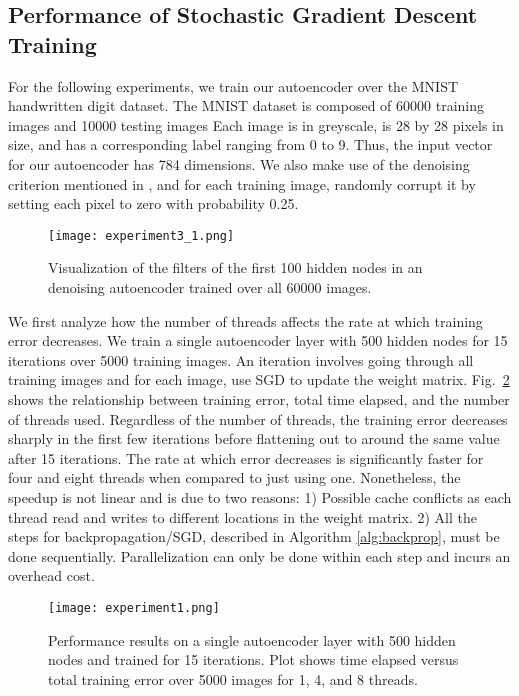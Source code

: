 \FloatBarrier
\subsection{Performance of Stochastic Gradient Descent Training}

For the following experiments, we train our autoencoder over the MNIST handwritten digit
dataset. The MNIST dataset is composed of 60000 training images and 10000
testing images Each image is in greyscale, is 28 by 28 pixels in size, and has
a corresponding label ranging from 0 to 9. Thus, the input vector for our
autoencoder has 784 dimensions. We also make use of the denoising criterion
mentioned in \cite{vincent2010stacked}, and for each training image, randomly
corrupt it by setting each pixel to zero with probability 0.25. 

\begin{figure}[h] \centering
	\texttt{[image: experiment3\_1.png]}
	\caption{Visualization of the filters of the first 100 hidden nodes in an
	denoising autoencoder trained over all 60000 images.}
	\label{fig:experiment3_1}
\end{figure}

We first analyze how the number of threads affects the rate at which training
error decreases. We train a single autoencoder layer with 500 hidden nodes for
15 iterations over 5000 training images. An iteration involves going through
all training images and for each image, use SGD to update the weight matrix.
Fig.~\ref{fig:experiment1} shows the relationship between training error, total
time elapsed, and the number of threads used. Regardless of the number of
threads, the training error decreases sharply in the first few iterations
before flattening out to around the same value after 15 iterations. The rate at
which error decreases is significantly faster for four and eight threads when
compared to just using one. Nonetheless, the speedup is not linear and is due
to two reasons: 1) Possible cache conflicts as each thread read and writes to
different locations in the weight matrix. 2) All the steps for
backpropagation/SGD, described in Algorithm \ref{alg:backprop}, must be done
sequentially. Parallelization can only be done within each step and incurs an
overhead cost.

\begin{figure}[h]
\centering
\texttt{[image: experiment1.png]}
\caption{Performance results on a single autoencoder layer with 500 hidden nodes and trained for 15 iterations. Plot shows time elapsed versus total training error over 5000 images for 1, 4, and 8 threads.}
\label{fig:experiment1}
\end{figure}


